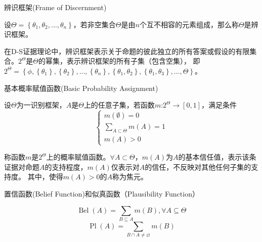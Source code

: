 \begin{definition}
辨识框架(Frame of Discernment)
\end{definition}

设$\Theta=\left\{\theta_{1}, \theta_{2}, \ldots, \theta_{n}\right\}$，若非空集合$\Theta$是由$n$个互不相容的元素组成，那么称$\Theta$是辨识框架。

在D-S证据理论中，辨识框架表示关于命题的彼此独立的所有答案或假设的有限集合\cite{refs80}。$2^\Theta$是$\Theta$的幂集，表示辨识框架的所有子集（包含空集），
即$2^{\Theta}=\left\{\phi,\left\{\theta_{1}\right\},\left\{\theta_{2}\right\}, \ldots,\left\{\theta_{n}\right\},\left\{\theta_{1}, \theta_{2}\right\},\left\{\theta_{1}, \theta_{3}\right\}, \ldots, \Theta\right\}$。

\begin{definition}
基本概率赋值函数(Basic Probability Assignment)
\end{definition}

设$\Theta$为一识别框架，$A$是$\Theta$上的任意子集，若函数$m$:$2^{\Theta} \rightarrow[0,1]$，满足条件
\begin{equation}
\left\{\begin{array}{l}{m(\emptyset)=0} \\ {\sum_{A \subset \Theta} m(A)=1} \\ {m(A)>0}\end{array}\right.
\end{equation}

称函数$m$是$2^\Theta$上的概率赋值函数。$\forall A \subset \Theta$，$m(A)$为$A$的基本信任值，表示该条证据对命题$A$的支持程度，$m(A)$仅表示对$A$的信任，不反映对其他任何子集的支持度。
其中，使得$m(A)>0$的$A$称为焦元。
\begin{definition}
置信函数(Belief Function)和似真函数（Plausibility Function）
\end{definition}
\begin{equation}
  \label{equ:chap4:bel}
  \operatorname{Bel}(A)=\sum_{B \subseteq A} m(B), \forall A \subseteq \Theta
\end{equation}
\begin{equation}
  \label{equ:chap4:Pl}
  \operatorname{Pl}(A)=\sum_{B \cap A \neq \varnothing} m(B)
\end{equation}

